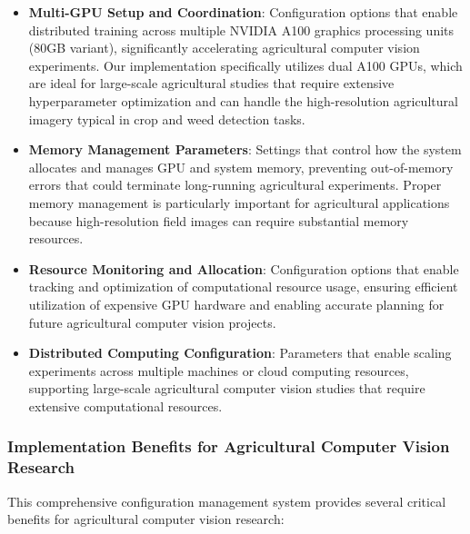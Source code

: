 \begin{itemize}
    \item \textbf{Multi-GPU Setup and Coordination}: Configuration options that enable distributed training across multiple NVIDIA A100 graphics processing units (80GB variant), significantly accelerating agricultural computer vision experiments. Our implementation specifically utilizes dual A100 GPUs, which are ideal for large-scale agricultural studies that require extensive hyperparameter optimization and can handle the high-resolution agricultural imagery typical in crop and weed detection tasks.
    
    \item \textbf{Memory Management Parameters}: Settings that control how the system allocates and manages GPU and system memory, preventing out-of-memory errors that could terminate long-running agricultural experiments. Proper memory management is particularly important for agricultural applications because high-resolution field images can require substantial memory resources.
    
    \item \textbf{Resource Monitoring and Allocation}: Configuration options that enable tracking and optimization of computational resource usage, ensuring efficient utilization of expensive GPU hardware and enabling accurate planning for future agricultural computer vision projects.
    
    \item \textbf{Distributed Computing Configuration}: Parameters that enable scaling experiments across multiple machines or cloud computing resources, supporting large-scale agricultural computer vision studies that require extensive computational resources.
\end{itemize}

\subsubsection{Implementation Benefits for Agricultural Computer Vision Research}

This comprehensive configuration management system provides several critical benefits for agricultural computer vision research:

